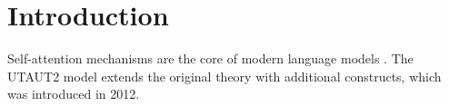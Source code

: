 \documentclass{article}
\begin{document}
\section{Introduction}
Self-attention mechanisms are the core of modern language models \cite{vaswani2017attention}.
The UTAUT2 model extends the original theory with additional constructs, which was introduced in 2012.


\end{document}
